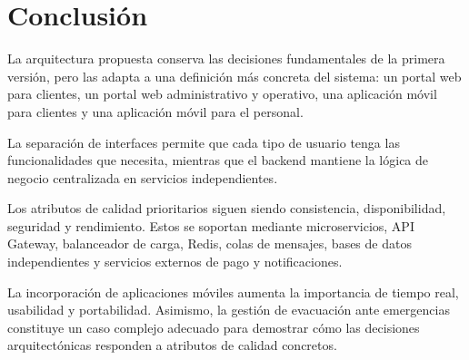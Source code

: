 \documentclass[12pt,a4paper]{article}
\begin{document}
\section{Conclusión}

La arquitectura propuesta conserva las decisiones fundamentales de la primera versión, pero las adapta a una definición más concreta del sistema: un portal web para clientes, un portal web administrativo y operativo, una aplicación móvil para clientes y una aplicación móvil para el personal.

La separación de interfaces permite que cada tipo de usuario tenga las funcionalidades que necesita, mientras que el backend mantiene la lógica de negocio centralizada en servicios independientes.

Los atributos de calidad prioritarios siguen siendo consistencia, disponibilidad, seguridad y rendimiento. Estos se soportan mediante microservicios, API Gateway, balanceador de carga, Redis, colas de mensajes, bases de datos independientes y servicios externos de pago y notificaciones.

La incorporación de aplicaciones móviles aumenta la importancia de tiempo real, usabilidad y portabilidad. Asimismo, la gestión de evacuación ante emergencias constituye un caso complejo adecuado para demostrar cómo las decisiones arquitectónicas responden a atributos de calidad concretos.
\end{document}
